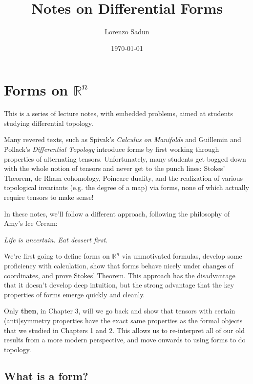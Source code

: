 \documentclass[12pt]{amsbook}
\newcommand{\R}{{\mathbb R}}
\theoremstyle{definition}
\begin{document}
\title{Notes on Differential Forms}
\author{Lorenzo Sadun}
\address{Department of Mathematics\\The University of
  Texas at Austin\\ Austin, TX 78712} 

\date{\today}


\maketitle



\setlength{\baselineskip}{.6cm}

\chapter{Forms on $\R^n$}
This is a series of lecture notes, with embedded problems,
aimed at students studying differential topology. 

Many revered texts, such as Spivak's {\em Calculus on Manifolds} and 
Guillemin and Pollack's {\em Differential Topology} introduce forms 
by first working through properties of alternating tensors. Unfortunately,
many students get bogged down with the whole notion of tensors
and never get to the punch lines: Stokes' Theorem, de Rham cohomology,
Poincare duality, and the realization of various topological invariants
(e.g. the degree of a map) via forms, none of which actually require tensors
to make sense! 

In these notes, we'll follow a different approach, following the philosophy
of Amy's Ice Cream: 

\centerline{\em Life is uncertain. Eat dessert first.}

We're first going to 
define forms on $\R^n$ via unmotivated formulas, develop some proficiency
with calculation, show that forms behave
nicely under changes of coordinates, and prove Stokes' Theorem. 
This approach has the disadvantage that it 
doesn't develop deep intuition, but the strong advantage that the key
properties of forms emerge quickly and cleanly. 

Only {\bf then}, in Chapter 3, will we go back and 
show that tensors
with certain (anti)symmetry properties have the exact same properties as
the formal objects that we studied in Chapters 1 and 2. This allows us to
re-interpret all of our old results from a more modern perspective, and
move onwards to using forms to do topology. 

\section{What is a form?}
\end{document}
